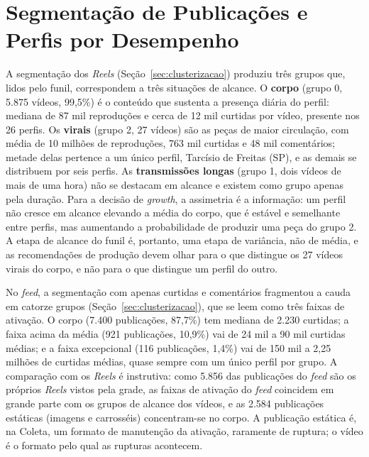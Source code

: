 \section{Segmentação de Publicações e Perfis por Desempenho}\label{sec:segmentacao}

A segmentação dos \emph{Reels} (Seção~\ref{sec:clusterizacao}) produziu três grupos que, lidos pelo funil, correspondem a três situações de alcance. O \textbf{corpo} (grupo 0, 5.875 vídeos, 99,5\%) é o conteúdo que sustenta a presença diária do perfil: mediana de 87 mil reproduções e cerca de 12 mil curtidas por vídeo, presente nos 26 perfis. Os \textbf{virais} (grupo 2, 27 vídeos) são as peças de maior circulação, com média de 10 milhões de reproduções, 763 mil curtidas e 48 mil comentários; metade delas pertence a um único perfil, Tarcísio de Freitas (SP), e as demais se distribuem por seis perfis. As \textbf{transmissões longas} (grupo 1, dois vídeos de mais de uma hora) não se destacam em alcance e existem como grupo apenas pela duração. Para a decisão de \emph{growth}, a assimetria é a informação: um perfil não cresce em alcance elevando a média do corpo, que é estável e semelhante entre perfis, mas aumentando a probabilidade de produzir uma peça do grupo 2. A etapa de alcance do funil é, portanto, uma etapa de variância, não de média, e as recomendações de produção devem olhar para o que distingue os 27 vídeos virais do corpo, e não para o que distingue um perfil do outro.


No \emph{feed}, a segmentação com apenas curtidas e comentários fragmentou a cauda em catorze grupos (Seção~\ref{sec:clusterizacao}), que se leem como três faixas de ativação. O corpo (7.400 publicações, 87,7\%) tem mediana de 2.230 curtidas; a faixa acima da média (921 publicações, 10,9\%) vai de 24 mil a 90 mil curtidas médias; e a faixa excepcional (116 publicações, 1,4\%) vai de 150 mil a 2,25 milhões de curtidas médias, quase sempre com um único perfil por grupo. A comparação com os \emph{Reels} é instrutiva: como 5.856 das publicações do \emph{feed} são os próprios \emph{Reels} vistos pela grade, as faixas de ativação do \emph{feed} coincidem em grande parte com os grupos de alcance dos vídeos, e as 2.584 publicações estáticas (imagens e carrosséis) concentram-se no corpo. A publicação estática é, na Coleta, um formato de manutenção da ativação, raramente de ruptura; o vídeo é o formato pelo qual as rupturas acontecem.



